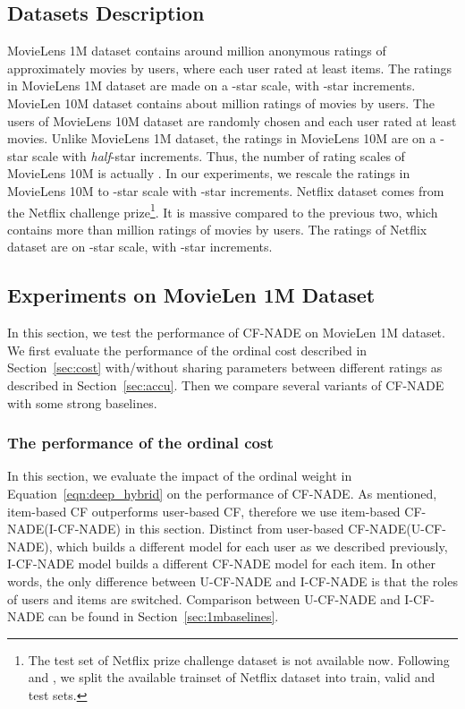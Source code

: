 \documentclass{article}
\newcommand{\cfnade}{CF-NADE\xspace}
\begin{document}
\subsection{Datasets Description}
\label{sec:datasets}
MovieLens 1M dataset contains around  million anonymous ratings of
approximately  movies by  users, where each user rated at
least  items. The ratings in MovieLens 1M dataset are made on a
-star scale, with -star increments. MovieLen 10M dataset
contains about  million ratings of  movies by 
users. The users of MovieLens 10M dataset are randomly chosen and each
user rated at least  movies. Unlike MovieLens 1M dataset, the
ratings in MovieLens 10M are on a -star scale with
\textit{half}-star increments. Thus, the number of rating scales of
MovieLens 10M is actually . In our experiments, we rescale the
ratings in MovieLens 10M to -star scale with -star
increments. Netflix dataset comes from the Netflix challenge
prize\footnote{The test set of Netflix prize challenge dataset is not
  available now. Following \citet{lee2013local} and
  \citet{sedhain2015autorec}, we split the available trainset of
  Netflix dataset into train, valid and test sets.}. It
is massive compared to the previous two, which contains more than
 million ratings of  movies by  users. The ratings
of Netflix dataset are on -star scale, with -star increments.



\subsection{Experiments on MovieLen 1M Dataset}
\label{sec:movielens1m}

In this section, we test the performance of \cfnade on MovieLen 1M
dataset. We first evaluate the performance of the ordinal cost
described in Section~\ref{sec:cost} with/without sharing parameters
between different ratings as described in Section~\ref{sec:accu}. Then
we compare several variants of \cfnade with some strong baselines.

\subsubsection{The performance of the ordinal cost}
\label{sec:variants}

In this section, we evaluate the impact of the ordinal weight  in
Equation~\ref{eqn:deep_hybrid} on the performance of \cfnade. As
\citet{sedhain2015autorec} mentioned, item-based CF outperforms
user-based CF, therefore we use item-based \cfnade (I-\cfnade) in this
section. Distinct from user-based \cfnade (U-\cfnade), which builds a
different model for each user as we described previously, I-\cfnade
model builds a different \cfnade model for each item. In other words,
the only difference between U-\cfnade and I-\cfnade is that the roles
of users and items are switched. Comparison between U-\cfnade and
I-\cfnade can be found in Section~\ref{sec:1mbaselines}.
\end{document}
